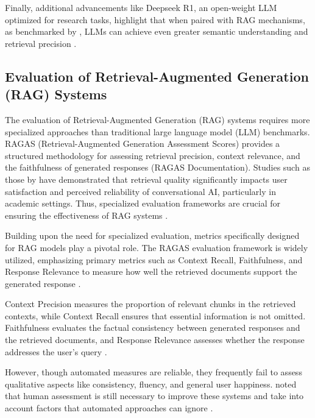 \begin{refsection}
\hspace{0.4cm}Finally, additional advancements like Deepseek R1, an open-weight LLM optimized for research tasks, highlight that when paired with RAG mechanisms, as benchmarked by \citeauthor{opencompass2024} \citeyear{opencompass2024}, LLMs can achieve even greater semantic understanding and retrieval precision \cite{opencompass2024}.


\subsection{Evaluation of Retrieval-Augmented Generation (RAG) Systems}

\hspace{0.4cm}The evaluation of Retrieval-Augmented Generation (RAG) systems requires more specialized approaches than traditional large language model (LLM) benchmarks. RAGAS (Retrieval-Augmented Generation Assessment Scores) provides a structured methodology for assessing retrieval precision, context relevance, and the faithfulness of generated responses (RAGAS Documentation). Studies such as those by \citeauthor{shuster2021retrieval} \citeyear{shuster2021retrieval} have demonstrated that retrieval quality significantly impacts user satisfaction and perceived reliability of conversational AI, particularly in academic settings. Thus, specialized evaluation frameworks are crucial for ensuring the effectiveness of RAG systems \cite{shuster2021retrieval}.

\hspace{0.4cm}Building upon the need for specialized evaluation, metrics specifically designed for RAG models play a pivotal role. The RAGAS evaluation framework is widely utilized, emphasizing primary metrics such as Context Recall, Faithfulness, and Response Relevance to measure how well the retrieved documents support the generated response \cite{roychowdhury2024evaluation}.

Context Precision measures the proportion of relevant chunks in the retrieved contexts, while Context Recall ensures that essential information is not omitted. Faithfulness evaluates the factual consistency between generated responses and the retrieved documents, and Response Relevance assesses whether the response addresses the user's query \cite{aquino2024extracting} \cite{deepak2025langchain}.

\hspace{0.4cm}However, though automated measures are reliable, they frequently fail to assess qualitative aspects like consistency, fluency, and general user happiness. \citeauthor{sivasothy2024ragprobe} \citeyear{sivasothy2024ragprobe} noted that human assessment is still necessary to improve these systems and take into account factors that automated approaches can ignore \cite{sivasothy2024ragprobe}.


\end{refsection}

